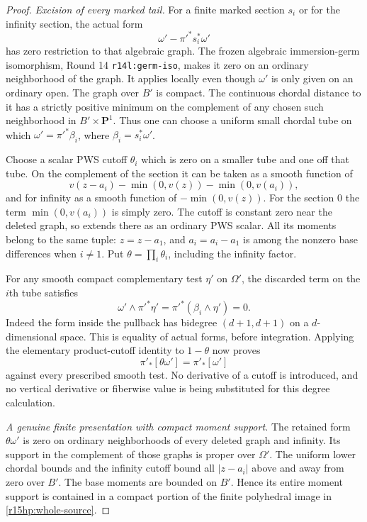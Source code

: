 \begin{proof}
\emph{Excision of every marked tail.}
For a finite marked section $s_i$ or for the infinity section,
the actual form
\[
              \omega'-\pi'^*s_i^*\omega'
\tag{HP15.5}\label{r15hp:graph-difference}
\]
has zero restriction to that algebraic graph.  The frozen
algebraic immersion-germ isomorphism, Round 14
\texttt{r14l:germ-iso}, makes it zero on an ordinary neighborhood
of the graph.  It applies locally even though $\omega'$ is only
given on an ordinary open.  The graph over $B'$ is compact.
The continuous chordal distance to it has a strictly positive
minimum on the complement of any chosen such neighborhood in
$B'\times\mathbf P^1$.  Thus one can choose a uniform small
chordal tube on which
$\omega'=\pi'^*\beta_i$, where $\beta_i=s_i^*\omega'$.

Choose a scalar PWS cutoff $\theta_i$ which is zero on a smaller
tube and one off that tube.  On the complement of the section it
can be taken as a smooth function of
\[
 v(z-a_i)-\min(0,v(z))-\min(0,v(a_i)),
\tag{HP15.6}\label{r15hp:chordal-moments}
\]
and for infinity as a smooth function of $-\min(0,v(z))$.
For the section $0$ the term $\min(0,v(a_i))$ is simply zero.
The cutoff is constant zero near the deleted graph, so extends
there as an ordinary PWS scalar.  All its moments belong to the
same tuple: $z=z-a_1$, and $a_i=a_i-a_1$ is among the nonzero
base differences when $i\ne1$.  Put $\theta=\prod_i\theta_i$,
including the infinity factor.

For any smooth compact complementary test $\eta'$ on $\Omega'$,
the discarded term on the $i$th tube satisfies
\[
 \omega'\wedge\pi'^*\eta'
     =\pi'^*(\beta_i\wedge\eta')=0.
\tag{HP15.7}\label{r15hp:tail-degree}
\]
Indeed the form inside the pullback has bidegree $(d+1,d+1)$
on a $d$-dimensional space.  This is equality of actual forms,
before integration.  Applying the elementary product-cutoff
identity to $1-\theta$ now proves
\[
 \pi'_*[\theta\omega']=\pi'_*[\omega']
\tag{HP15.8}\label{r15hp:tail-current}
\]
against every prescribed smooth test.  No derivative of a cutoff
is introduced, and no vertical derivative or fiberwise value is
being substituted for this degree calculation.

\emph{A genuine finite presentation with compact moment support.}
The retained form $\theta\omega'$ is zero on ordinary
neighborhoods of every deleted graph and infinity.  Its support
in the complement of those graphs is proper over $\Omega'$.
The uniform lower chordal bounds and the infinity cutoff bound
all $|z-a_i|$ above and away from zero over $B'$.  The base
moments are bounded on $B'$.  Hence its entire moment support is
contained in a compact portion of the finite polyhedral image
in \eqref{r15hp:whole-source}.


\end{proof}
